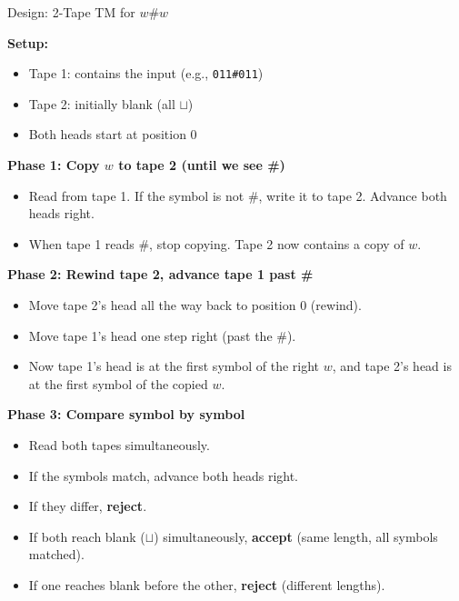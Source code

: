 \documentclass[11pt,a4paper]{article}
\begin{document}
\begin{examplebox}{Design: 2-Tape TM for $w\#w$}

\textbf{Setup:}
\begin{itemize}[nosep]
\item Tape 1: contains the input (e.g., \texttt{011\#011})
\item Tape 2: initially blank (all $\sqcup$)
\item Both heads start at position 0
\end{itemize}

\textbf{Phase 1: Copy $w$ to tape 2 (until we see \#)}
\begin{itemize}[nosep]
\item Read from tape 1. If the symbol is not \#, write it to tape 2. Advance both heads right.
\item When tape 1 reads \#, stop copying. Tape 2 now contains a copy of $w$.
\end{itemize}

\textbf{Phase 2: Rewind tape 2, advance tape 1 past \#}
\begin{itemize}[nosep]
\item Move tape 2's head all the way back to position 0 (rewind).
\item Move tape 1's head one step right (past the \#).
\item Now tape 1's head is at the first symbol of the right $w$, and tape 2's head is at the first symbol of the copied $w$.
\end{itemize}

\textbf{Phase 3: Compare symbol by symbol}
\begin{itemize}[nosep]
\item Read both tapes simultaneously.
\item If the symbols match, advance both heads right.
\item If they differ, \textbf{reject}.
\item If both reach blank ($\sqcup$) simultaneously, \textbf{accept} (same length, all symbols matched).
\item If one reaches blank before the other, \textbf{reject} (different lengths).
\end{itemize}
\end{examplebox}
\end{document}
